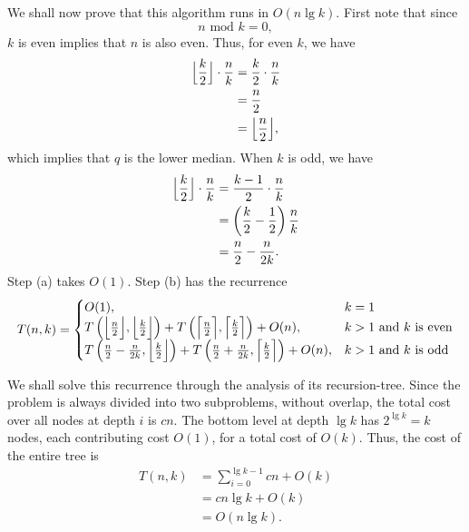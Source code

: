 \begin{enumerate}
\begin{framed}
We shall now prove that this algorithm runs in $O(n \lg k)$. First note that
since
\[
  n \text{ mod } k = 0,
\]
$k$ is even implies that $n$ is also even. Thus, for even $k$, we have
\begin{equation*}
\begin{aligned}
  \Bigl\lfloor \frac{k}{2} \Bigr\rfloor \cdot \frac{n}{k}
  &= \frac{k}{2} \cdot \frac{n}{k}\\
  &= \frac{n}{2}\\
  &= \Bigl\lfloor \frac{n}{2} \Bigr\rfloor,
\end{aligned}
\end{equation*}
which implies that $q$ is the lower median. When $k$ is odd, we have
\begin{equation*}
\begin{aligned}
  \Bigl\lfloor \frac{k}{2} \Bigr\rfloor \cdot \frac{n}{k}
  &=   \frac{k - 1}{2} \cdot \frac{n}{k}\\
  &=   \left( \frac{k}{2} - \frac{1}{2} \right) \frac{n}{k}\\
  &=   \frac{n}{2} - \frac{n}{2k}.
\end{aligned}
\end{equation*}
Step (a) takes $O(1)$. Step (b) has the recurrence
\begin{equation*}
T(n, k) =
\begin{cases}
  O(1), & k = 1\\
  T\left( \Bigl\lfloor \frac{n}{2} \Bigr\rfloor, \Bigl\lfloor \frac{k}{2} \Bigr\rfloor \right) +
  T\left( \Bigl\lceil \frac{n}{2} \Bigr\rceil, \Bigl\lceil \frac{k}{2} \Bigr\rceil \right) +
  O(n), & \text{$k > 1$ and $k$ is even}\\
  T\left( \frac{n}{2} - \frac{n}{2k}, \Bigl\lfloor \frac{k}{2} \Bigr\rfloor \right) +
  T\left( \frac{n}{2} + \frac{n}{2k}, \Bigl\lceil \frac{k}{2} \Bigr\rceil \right) +
  O(n), & \text{$k > 1$ and $k$ is odd}
\end{cases}
\end{equation*}

We shall solve this recurrence through the analysis of its recursion-tree. Since
the problem is always divided into two subproblems, without overlap, the total
cost over all nodes at depth $i$ is $cn$. The bottom level at depth $\lg k$
has $2^{\lg k} = k$ nodes, each contributing cost $O(1)$, for a total cost of
$O(k)$. Thus, the cost of the entire tree is \begin{equation*}
\begin{aligned}
  T(n, k) &= \sum_{i = 0}^{\lg k - 1} cn + O(k)\\
          &= cn \lg k + O(k)\\
          &= O(n \lg k).
\end{aligned}
\end{equation*}


\end{framed}
\end{enumerate}
